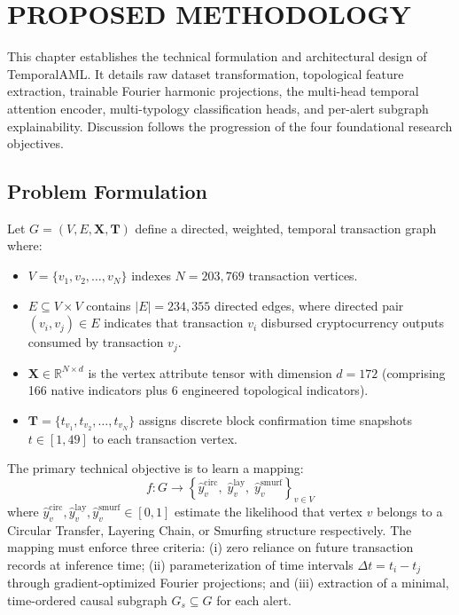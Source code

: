 \chapter{PROPOSED METHODOLOGY}
\label{ChapterResearchMethodology}

This chapter establishes the technical formulation and architectural design of TemporalAML. It details raw dataset transformation, topological feature extraction, trainable Fourier harmonic projections, the multi-head temporal attention encoder, multi-typology classification heads, and per-alert subgraph explainability. Discussion follows the progression of the four foundational research objectives.


\section{Problem Formulation}
\label{sec:meth_problem}

Let $G = (V, E, \mathbf{X}, \mathbf{T})$ define a directed, weighted, temporal transaction graph where:
\begin{itemize}
	\item $V = \{v_1, v_2, \ldots, v_N\}$ indexes $N = 203{,}769$ transaction vertices.
	\item $E \subseteq V \times V$ contains $|E| = 234{,}355$ directed edges, where directed pair $(v_i, v_j) \in E$ indicates that transaction $v_i$ disbursed cryptocurrency outputs consumed by transaction $v_j$.
	\item $\mathbf{X} \in \mathbb{R}^{N \times d}$ is the vertex attribute tensor with dimension $d = 172$ (comprising 166 native indicators plus 6 engineered topological indicators).
	\item $\mathbf{T} = \{t_{v_1}, t_{v_2}, \ldots, t_{v_N}\}$ assigns discrete block confirmation time snapshots $t \in [1, 49]$ to each transaction vertex.
\end{itemize}

\noindent The primary technical objective is to learn a mapping:
\begin{equation}
f: G \rightarrow \left\{ \hat{y}^{\text{circ}}_v, \; \hat{y}^{\text{lay}}_v, \; \hat{y}^{\text{smurf}}_v \right\}_{v \in V}
\end{equation}
where $\hat{y}^{\text{circ}}_v, \hat{y}^{\text{lay}}_v, \hat{y}^{\text{smurf}}_v \in [0, 1]$ estimate the likelihood that vertex $v$ belongs to a Circular Transfer, Layering Chain, or Smurfing structure respectively. The mapping must enforce three criteria: (i) zero reliance on future transaction records at inference time; (ii) parameterization of time intervals $\Delta t = t_i - t_j$ through gradient-optimized Fourier projections; and (iii) extraction of a minimal, time-ordered causal subgraph $G_s \subseteq G$ for each alert.


